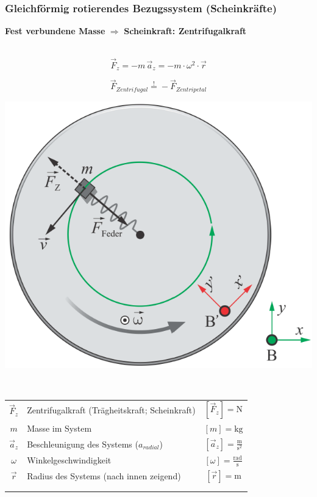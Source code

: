 		\subsubsection{Gleichförmig rotierendes Bezugssystem (Scheinkräfte)}

			\textbf{Fest verbundene Masse} $\Rightarrow$ \textbf{Scheinkraft: Zentrifugalkraft} \\
				\\
				\begin{minipage}{0.48\linewidth}
					$$ \boxed{ \vec{F}_z = - m \, \vec{a}_z = - m \cdot \omega^2 \cdot \vec{r} }$$ 
					
					$$ \boxed{ \vec{F}_{Zentrifugal}  \overset{!}{=} - \vec{F}_{Zentripetal} }$$ 
				\end{minipage}
				\hfill
				\begin{minipage}{0.48\linewidth}
					\includegraphics[width=0.75\linewidth]{Bilder/zentrifugalkraft} \\
				\end{minipage}
				\\
				\begin{tabular}{c l c}
					$\vec{F}_z$ & Zentrifugalkraft (Trägheitskraft; Scheinkraft) & $[\vec{F}_z] = \mathrm{N}$ \\
					$m$ & Masse im System & $[m] = \mathrm{kg}$ \\
					$\vec{a}_z$ & Beschleunigung des Systems ($a_{radial}$) & $[\vec{a}_z] = \mathrm{\frac{m}{s^2}}$ \\
					$\omega$ & Winkelgeschwindigkeit & $[\omega] = \mathrm{\frac{rad}{s}}$ \\
					$\vec{r}$ & Radius des Systems (nach innen zeigend) & $[\vec{r}] = \mathrm{m}$ \\ 
					\\
					\\
				\end{tabular}

